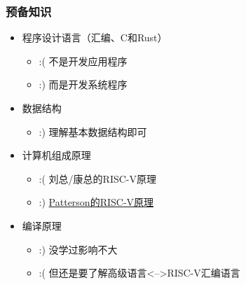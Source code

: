 \begin{frame}
    
    \frametitle{预备知识}
    
    \begin{itemize}
        
        \item 程序设计语言（汇编、C和Rust）
        \begin{itemize}
            \item :( 不是开发应用程序
            \item :) 而是开发系统程序
        \end{itemize}
        \item 数据结构
        \begin{itemize}
            \item :) 理解基本数据结构即可 
        \end{itemize}
        \item 计算机组成原理
        \begin{itemize}
            \item :( 刘总/康总的RISC-V原理 
            \item  :)  \href{http://crva.ict.ac.cn/documents/RISC-V-Reader-Chinese-v2p1.pdf}{Patterson的RISC-V原理}
        \end{itemize}
        \item 编译原理
        \begin{itemize}
            \item :) 没学过影响不大  
            \item :( 但还是要了解高级语言<-->RISC-V汇编语言
            
        \end{itemize}
        
    \end{itemize}
    
\end{frame}

